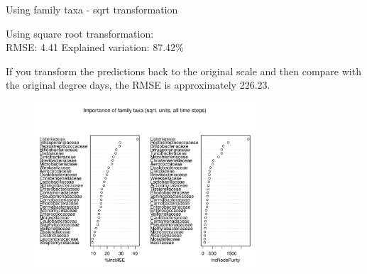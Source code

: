 \documentclass{beamer}
\begin{document}
\begin{frame}{Using family taxa - sqrt transformation}
  
  {\scriptsize
    
  \noindent Using square root transformation:\\
  RMSE: 4.41  \hspace{0.05in}  Explained variation: 87.42\%

  \vspace{0.05in}
  
  \noindent If you transform the predictions back to the original
  scale and then compare with the original degree days, the RMSE is
  approximately 226.23.
  
\begin{center}
\begin{figure}
  \includegraphics[width=3.25in]{../only_families/all_time_steps/sqrt_units_all_data_families_imp_plot}
\end{figure}
\end{center}
\vspace{-0.25in}
}
  
\end{frame}
\end{document}
